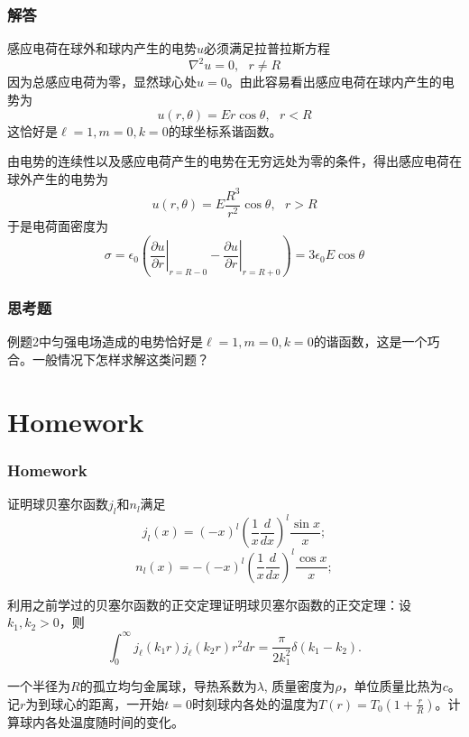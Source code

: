 \documentclass[CJK]{beamer}
\begin{document}
\begin{frame}
\frametitle{解答}


感应电荷在球外和球内产生的电势$u$必须满足拉普拉斯方程
$$\nabla^2 u = 0,\ \ \ r\ne R$$
因为总感应电荷为零，显然球心处$u=0$。由此容易看出感应电荷在球内产生的电势为
$$ u(r, \theta) = E r \cos\theta,\ \ \ r<R $$
这恰好是$\ell =1, m = 0, k=0$的球坐标系谐函数。

由电势的连续性以及感应电荷产生的电势在无穷远处为零的条件，得出感应电荷在球外产生的电势为
$$ u(r, \theta) = E \frac{R^3}{r^2}\cos\theta, \ \ \ r>R $$
于是电荷面密度为
$$\sigma =  \epsilon_0\left(\left.\frac{\partial u}{\partial r}\right\vert_{r=R-0}-\left.\frac{\partial u}{\partial r}\right\vert_{r=R+0}\right) = 3\epsilon_0E\cos\theta $$ 

\end{frame}



\begin{frame}
\frametitle{思考题}



例题2中匀强电场造成的电势恰好是$\ell = 1, m = 0, k=0$的谐函数，这是一个巧合。一般情况下怎样求解这类问题？

\end{frame}




  


\section{Homework}

\begin{frame}
\frametitle{Homework}
\bitem
\item{证明球贝塞尔函数$j_l$和$n_l$满足
  $$ j_l(x) = (-x)^l\left(\frac{1}{x}\frac{d}{dx}\right)^l\frac{\sin x}{x}; $$
  $$ n_l(x) = -(-x)^l\left(\frac{1}{x}\frac{d}{dx}\right)^l\frac{\cos x}{x}; $$}
\item{利用之前学过的贝塞尔函数的正交定理证明球贝塞尔函数的正交定理：设$k_1, k_2>0$，则
  $$\int_0^\infty j_{\ell}(k_1r)j_{\ell}(k_2r) r^2 dr = \frac{\pi}{2k_1^2} \delta(k_1-k_2).$$}
\item{一个半径为$R$的孤立均匀金属球，导热系数为$\lambda$, 质量密度为$\rho$，单位质量比热为$c$。记$r$为到球心的距离，一开始$t=0$时刻球内各处的温度为$T(r) = T_0\left(1+\frac{r}{R}\right)$。计算球内各处温度随时间的变化。}  
\eitem
\end{frame}

\ech
\end{document}
